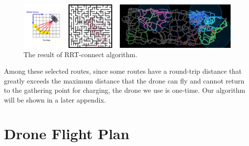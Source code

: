 \documentclass{article} %
\begin{document}
\begin{figure}[h]
        \centering
        \includegraphics[scale=0.5]{RRT.png}
        \caption{The result of RRT-connect algorithm.}
    \end{figure}

    Among these selected routes, since some routes have a round-trip distance that greatly exceeds the maximum distance that the drone can fly and cannot return to the gathering point for charging, the drone we use is one-time.
    Our algorithm will be shown in a later appendix.
    

\section{Drone Flight Plan}
\end{document}
